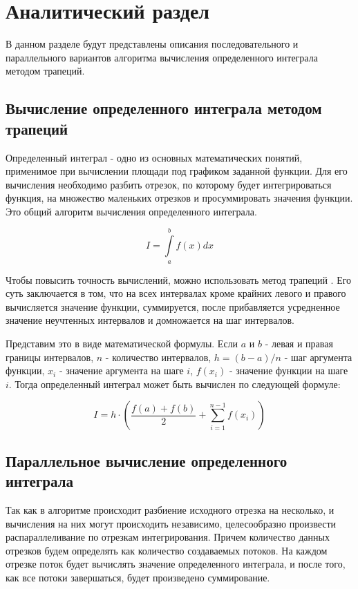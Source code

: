 \chapter{Аналитический раздел}

В данном разделе будут представлены описания последовательного и параллельного вариантов алгоритма вычисления определенного интеграла методом трапеций.

\section{Вычисление определенного интеграла методом трапеций}

Определенный интеграл - одно из основных математических понятий, применимое при вычислении площади под графиком заданной функции. Для его вычисления необходимо разбить отрезок, по которому будет интегрироваться функция, на множество маленьких отрезков и просуммировать значения функции. Это общий алгоритм вычисления определенного интеграла.

\begin{equation}
	I = \int\limits_a^b f(x)dx 
\end{equation}

Чтобы повысить точность вычислений, можно использовать метод трапеций \cite{int}. Его суть заключается в том, что на всех интервалах кроме крайних левого и правого вычисляется значение функции, суммируется, после прибавляется усредненное значение неучтенных интервалов и домножается на шаг интервалов.

Представим это в виде математической формулы. Если $a$ и $b$ - левая и правая границы интервалов, $n$ - количество интервалов, $h = (b - a) / n$ - шаг аргумента функции, $x_{i}$ - значение аргумента на шаге $i$, $f(x_{i})$ - значение функции на шаге $i$. Тогда определенный интеграл может быть вычислен по следующей формуле:

\begin{equation}
	I = h \cdot (\frac{f(a) + f(b)}{2} + \displaystyle\sum_{i = 1}^{n - 1} f(x_{i}))
\end{equation}

\section{Параллельное вычисление определенного интеграла}

Так как в алгоритме происходит разбиение исходного отрезка на несколько, и вычисления на них могут происходить независимо, целесообразно произвести распараллеливание по отрезкам интегрирования. Причем количество данных отрезков будем определять как количество создаваемых потоков. На каждом отрезке поток \cite{threads} будет вычислять значение определенного интеграла, и после того, как все потоки завершаться, будет произведено суммирование. 

